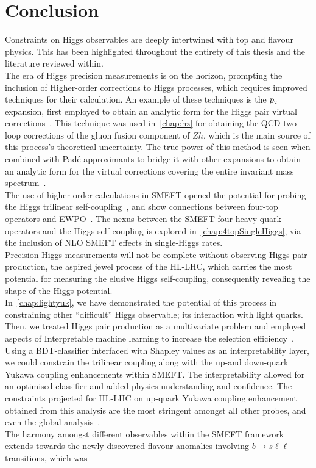 \chapter{Conclusion}
Constraints on Higgs observables are deeply intertwined with top and flavour physics. This has been highlighted throughout the entirety of this thesis and the literature reviewed within. \\  The era of Higgs precision measurements is on the horizon, prompting the inclusion of Higher-order corrections to Higgs processes, which requires improved techniques for their calculation. An example of these techniques is the $p_{\scriptscriptstyle T}$ expansion, first employed to obtain an analytic form for the Higgs pair virtual corrections~\cite{Bonciani:2018omm}. This technique was used in~\autoref{chap:hz} for obtaining the QCD two-loop corrections of the gluon fusion component of $Zh$, which is the main source of this process's theoretical uncertainty. The true power of this method is seen when combined with Pad\'e approximants to bridge it with other expansions to obtain an analytic form for the virtual corrections covering the entire invariant mass spectrum~\cite{Bellafronte:2022jmo}. \\ The use of higher-order calculations in SMEFT opened the potential for probing the Higgs trilinear self-coupling~\cite{Gorbahn:2016uoy, Degrassi:2016wml, Bizon:2016wgr, Maltoni:2017ims, Degrassi:2021uik}, and show connections between four-top operators and EWPO~\cite{Dawson:2022bxd}. The nexus between the SMEFT four-heavy quark operators and the Higgs self-coupling is explored in~\autoref{chap:4topSingleHiggs}, via the inclusion of NLO SMEFT effects in single-Higgs rates. \\ Precision Higgs measurements will not be complete without observing Higgs pair production, the aspired jewel process of the HL-LHC, which carries the most potential for measuring the elusive Higgs self-coupling,  consequently revealing the shape of the Higgs potential.\\ In~\autoref{chap:lightyuk}, we have demonstrated the potential of this process in constraining other ``difficult'' Higgs observable; its interaction with light quarks. Then, we treated Higgs pair production as a multivariate problem and employed aspects of Interpretable machine learning to increase the selection efficiency~\cite{Grojean:2020ech}. Using a BDT-classifier interfaced with Shapley values as an interpretability layer, we could constrain the trilinear coupling along with the up-and down-quark Yukawa coupling enhancements within SMEFT. The interpretability allowed for an optimised classifier and added physics understanding and confidence. The constraints projected for HL-LHC on up-quark Yukawa coupling enhancement obtained from this analysis are the most stringent amongst all other probes\cite{Soreq:2016rae,Falkowski:2020znk,Aguilar-Saavedra:2020rgo,Yu:2017vul}, and even the global analysis~\cite{deBlas:2019rxi}.  \\ The harmony amongst different observables within the SMEFT framework extends towards the newly-discovered flavour anomalies involving $ b \to s \ell \ell$ transitions, which was 
